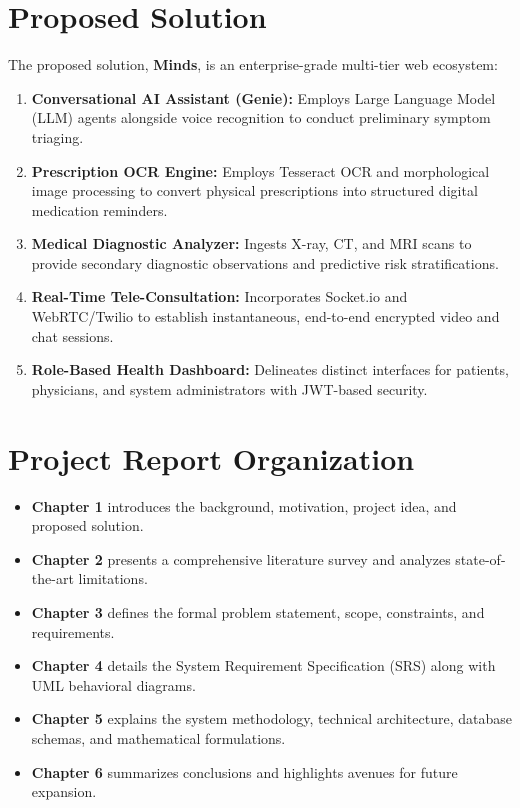 \documentclass[12pt,a4paper]{report}
\begin{document}
\section{Proposed Solution}
The proposed solution, \textbf{Minds}, is an enterprise-grade multi-tier web ecosystem:
\begin{enumerate}[label=\arabic*.]
    \item \textbf{Conversational AI Assistant (Genie):} Employs Large Language Model (LLM) agents alongside voice recognition to conduct preliminary symptom triaging.
    \item \textbf{Prescription OCR Engine:} Employs Tesseract OCR and morphological image processing to convert physical prescriptions into structured digital medication reminders.
    \item \textbf{Medical Diagnostic Analyzer:} Ingests X-ray, CT, and MRI scans to provide secondary diagnostic observations and predictive risk stratifications.
    \item \textbf{Real-Time Tele-Consultation:} Incorporates Socket.io and WebRTC/Twilio to establish instantaneous, end-to-end encrypted video and chat sessions.
    \item \textbf{Role-Based Health Dashboard:} Delineates distinct interfaces for patients, physicians, and system administrators with JWT-based security.
\end{enumerate}

\section{Project Report Organization}
\begin{itemize}[leftmargin=1.5cm]
    \item \textbf{Chapter 1} introduces the background, motivation, project idea, and proposed solution.
    \item \textbf{Chapter 2} presents a comprehensive literature survey and analyzes state-of-the-art limitations.
    \item \textbf{Chapter 3} defines the formal problem statement, scope, constraints, and requirements.
    \item \textbf{Chapter 4} details the System Requirement Specification (SRS) along with UML behavioral diagrams.
    \item \textbf{Chapter 5} explains the system methodology, technical architecture, database schemas, and mathematical formulations.
    \item \textbf{Chapter 6} summarizes conclusions and highlights avenues for future expansion.
\end{itemize}
\end{document}
